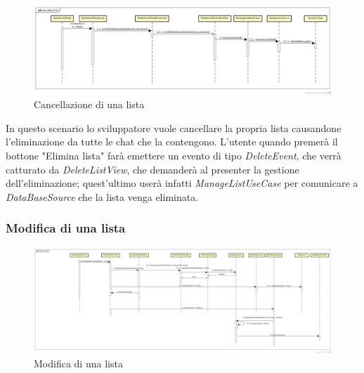 \label{Cancellazione di una lista}
\begin{figure}[H]
	\centering
	\includegraphics[width=\textwidth]{Sezioni/Diagrammi/App/cancellarelist.png}
	\caption{Cancellazione di una lista}
\end{figure}

In questo scenario lo sviluppatore vuole cancellare la propria lista causandone l'eliminazione da tutte le chat che la contengono. L'utente quando premerà il bottone "Elimina lista" farà emettere un evento di tipo \textit{DeleteEvent}, che verrà catturato da \textit{DeleteListView}, che demanderà al presenter la gestione dell'eliminazione; quest'ultimo userà infatti \textit{ManageListUseCase} per comunicare a \textit{DataBaseSource} che la lista venga eliminata.

\subsubsection{Modifica di una lista}

\label{Modifca di un lista}
\begin{figure}[H]
	\centering
	\includegraphics[width=\textwidth]{Sezioni/Diagrammi/App/modifica_lista.jpg}
	\caption{Modifica di una lista}
\end{figure}


